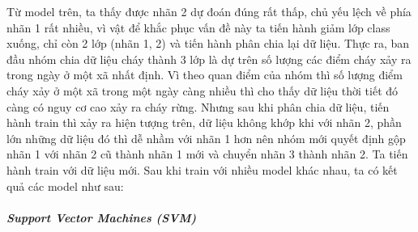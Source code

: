 \documentclass{article}
\begin{document}
Từ model trên, ta thấy được nhãn 2 dự đoán đúng rất thấp, chủ yếu lệch về phía nhãn 1 rất nhiều, vì vật để khắc phục vấn đề này ta tiến hành giảm lớp class xuống, chỉ còn 2 lớp (nhãn 1, 2) và tiến hành phân chia lại dữ liệu. Thực ra, ban đầu nhóm chia dữ liệu cháy thành 3 lớp là dự trên số lượng các điểm cháy xảy ra trong ngày ở một xã nhất định. Vì theo quan điểm của nhóm thì số lượng điểm cháy xảy ở một xã trong một ngày càng nhiều thì cho thấy dữ liệu thời tiết đó càng có nguy cơ cao xảy ra cháy rừng. Nhưng sau khi phân chia dữ liệu, tiến hành train thì xảy ra hiện tượng trên, dữ liệu không khớp khi với nhãn 2, phần lớn những dữ liệu đó thì dễ nhầm với nhãn 1 hơn nên nhóm mới quyết định gộp nhãn 1 với nhãn 2 cũ thành nhãn 1 mới và chuyển nhãn 3 thành nhãn 2. Ta tiến hành train với dữ liệu mới. Sau khi train với nhiều model khác nhau, ta có kết quả các model như sau:

\subparagraph{Support Vector Machines (SVM)}
\end{document}
